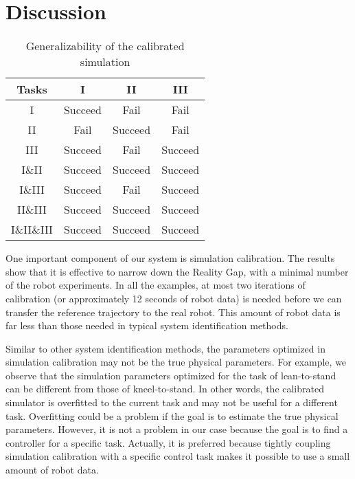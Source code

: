 \section{Discussion}
\begin{table}
  \caption{Generalizability of the calibrated simulation}
  \vspace{-0.1in}
 \label{table:generalize}
\begin{center}
\begin{tabular}{|c|c|c|c|}
\hline
 Tasks &  I &  II  &  III \\
 \hline
 I & Succeed & Fail & Fail  \\
 II & Fail & Succeed & Fail \\
 III & Succeed & Fail & Succeed \\
 I\&II & Succeed & Succeed & Succeed\\
 I\&III & Succeed & Fail & Succeed\\
 II\&III & Succeed & Succeed & Succeed \\
 I\&II\&III & Succeed & Succeed & Succeed\\
\hline
\end{tabular}
\vspace{-0.2in}
\end{center}
 \end{table}


One important component of our system is simulation calibration. The results show that it is effective to narrow down the Reality Gap, with a minimal number of the robot experiments. In all the examples, at most two iterations of calibration (or approximately 12 seconds of robot data) is needed before we can transfer the reference trajectory to the real robot. This amount of robot data is far less than those needed in typical system identification methods.

Similar to other system identification methods, the parameters optimized in simulation calibration may not be the true physical parameters. For example, we observe that the simulation parameters optimized for the task of lean-to-stand can be different from those of kneel-to-stand. In other words, the calibrated simulator is overfitted to the current task and may not be useful for a different task. Overfitting could be a problem if the goal is to estimate the true physical parameters. However, it is not a problem in our case because the goal is to find a controller for a specific task. Actually, it is preferred because tightly coupling simulation calibration with a specific control task makes it possible to use a small amount of robot data.

